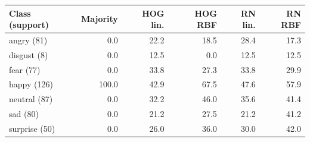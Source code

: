\begin{tabular}{lrrrrr}
\toprule
Class (support) & Majority & HOG lin. & HOG RBF & RN lin. & RN RBF \\
\midrule
angry (81) & 0.0 & 22.2 & 18.5 & 28.4 & 17.3 \\
disgust (8) & 0.0 & 12.5 & 0.0 & 12.5 & 12.5 \\
fear (77) & 0.0 & 33.8 & 27.3 & 33.8 & 29.9 \\
happy (126) & 100.0 & 42.9 & 67.5 & 47.6 & 57.9 \\
neutral (87) & 0.0 & 32.2 & 46.0 & 35.6 & 41.4 \\
sad (80) & 0.0 & 21.2 & 27.5 & 21.2 & 41.2 \\
surprise (50) & 0.0 & 26.0 & 36.0 & 30.0 & 42.0 \\
\bottomrule
\end{tabular}
